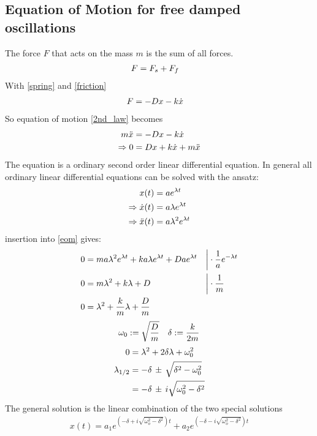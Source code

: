 \subsection{Equation of Motion for free damped oscillations}
The force \(F\) that acts on the mass \(m\) is the sum of all forces.
\begin{align}
F &= F_s + F_f \notag 
\end{align}
With \eqref{spring} and \eqref{friction}
\begin{align}
F &= -D x - k \dot x \notag
\end{align}
So equation of motion \eqref{2nd_law} becomes
\begin{align}
m\ddot{x} &= -D x - k \dot{x} \notag\\
\Rightarrow 0 &= D x + k \dot{x} + m\ddot{x}
\label{eom}
\end{align}
The equation is a ordinary second order linear differential equation. In general all ordinary linear differential equations can be solved with the ansatz:
\begin{align}
x(t) &= ae^{\lambda t} \notag\\
\Rightarrow \dot{x}(t) &= a \lambda e^{\lambda t} \notag\\
\Rightarrow \ddot{x}(t) &= a \lambda^2 e^{\lambda t} \notag
\end{align}
insertion into \eqref{eom} gives:
\begin{align}
0 &= m a \lambda^2 e^{\lambda t} + k a \lambda e^{\lambda t} + D a e^{\lambda t} &\bigg\vert& \cdot \frac{1}{a} e^{- \lambda t} \notag\\
0 &= m \lambda^2 + k \lambda + D &\bigg\vert& \cdot \frac{1}{m} \notag\\
0 &= \lambda^2 + \frac{k}{m} \lambda + \frac{D}{m} && \notag
\end{align}
\begin{align}
\omega_0 := \sqrt{\frac{D}{m}} & & \delta := \frac{k}{2m} \notag
\end{align}
\begin{align}
0 &= \lambda^2 + 2\delta \lambda + \omega_0^2 \notag \\
\lambda_{1/2} &= - \delta\, \pm\, \sqrt{\delta^2-\omega_0^2} \notag \\
 &= - \delta\, \pm\, i\sqrt{\omega_0^2- \delta^2} \notag
\end{align}
The general solution is the linear combination of the two special solutions
\begin{align}
x(t) = a_1e^{\left(-\delta+i\sqrt{\omega_o^2-\delta^2} \right)t} + a_2e^{\left(-\delta-i\sqrt{\omega_o^2-\delta^2} \right)t}
\label{x_norm}
\end{align}
